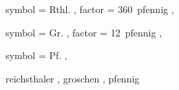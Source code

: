
 {
	symbol = { Rthl. } ,
	factor = { 360~pfennig } ,
}

 {
	symbol = { Gr. } ,
	factor = { 12~pfennig } ,
}

 {
	symbol = { Pf. } ,
}

 {
	reichsthaler ,
	groschen ,
	pfennig
}
